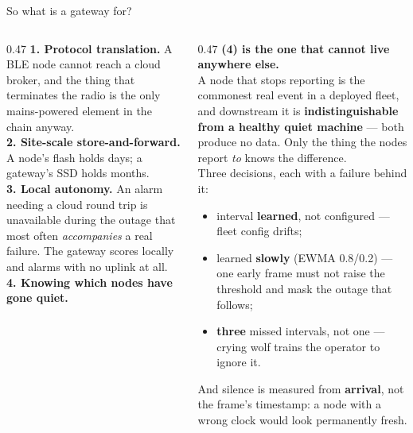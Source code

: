 \documentclass[aspectratio=169,10pt]{beamer}
\begin{document}
\begin{frame}{So what is a gateway for?}
  \begin{columns}[T]
    \begin{column}{0.47\textwidth}
      \scriptsize
      \textbf{1. Protocol translation.} A BLE node cannot reach a cloud
      broker, and the thing that terminates the radio is the only
      mains-powered element in the chain anyway.
      \\[1.5mm]
      \textbf{2. Site-scale store-and-forward.} A node's flash holds days; a
      gateway's SSD holds months.
      \\[1.5mm]
      \textbf{3. Local autonomy.} An alarm needing a cloud round trip is
      unavailable during the outage that most often \emph{accompanies} a real
      failure. The gateway scores locally and alarms with no uplink at all.
      \\[1.5mm]
      \textbf{4. Knowing which nodes have gone quiet.}
    \end{column}
    \begin{column}{0.47\textwidth}
      \scriptsize
      \textbf{(4) is the one that cannot live anywhere else.}
      \\[1mm]
      A node that stops reporting is the commonest real event in a deployed
      fleet, and downstream it is \textbf{indistinguishable from a healthy
      quiet machine} --- both produce no data. Only the thing the nodes report
      \emph{to} knows the difference.
      \\[2mm]
      \color{pdmink2}
      Three decisions, each with a failure behind it:
      \begin{itemize}\itemsep1pt
        \item interval \textbf{learned}, not configured --- fleet config drifts;
        \item learned \textbf{slowly} (EWMA 0.8/0.2) --- one early frame must
              not raise the threshold and mask the outage that follows;
        \item \textbf{three} missed intervals, not one --- crying wolf trains
              the operator to ignore it.
      \end{itemize}
      And silence is measured from \textbf{arrival}, not the frame's
      timestamp: a node with a wrong clock would look permanently fresh.
    \end{column}
  \end{columns}
\end{frame}
\end{document}

